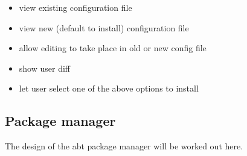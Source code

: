 \begin{itemize}
	\item view existing configuration file
	\item view new (default to install) configuration file
	\item allow editing to take place in old or new config file
	\item show user diff
	\item let user select one of the above options to install
\end{itemize}


\subsection{Package manager}
The design of the abt package manager will be worked out here.



